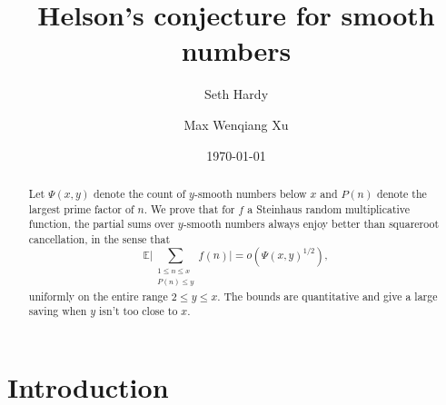 \documentclass[12pt,a4paper,reqno]{amsart}
\title[Helson's conjecture for smooth numbers]{Helson's conjecture for smooth numbers}
\author{Seth Hardy}
\author{Max Wenqiang Xu}
\date{\today}
\numberwithin{equation}{section}
\def\E{\mathbb E}
\def\leq {\leqslant}
\theoremstyle{remark}
\theoremstyle{definition}
\numberwithin{equation}{section}
\theoremstyle{remark}
\def\E{\mathbb E}
\begin{document}
\begin{abstract}
Let $\Psi(x,y)$ denote the count of $y$-smooth numbers below $x$ and $P(n)$ denote the largest prime factor of $n$. We prove that for $f$ a Steinhaus random multiplicative function, the partial sums over $y$-smooth numbers always enjoy better than squareroot cancellation, in the sense that
$$ \E \Big|\sum_{\substack{1\leq n \leq x\\ P(n) \leq y}} f(n) \Big| = o\left( \Psi(x,y)^{1/2} \right),$$
uniformly on the entire range $ 2 \leq y \leq x$. The bounds are quantitative and give a large saving when $y$ isn't too close to $x$.
\end{abstract} 

\maketitle
\section{Introduction}
\end{document}
